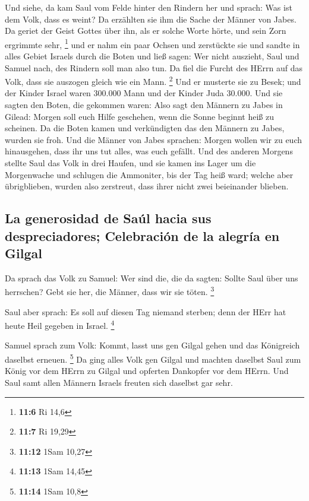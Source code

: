  Und siehe, da kam Saul vom Felde hinter den Rindern her
und sprach: Was ist dem Volk, dass es weint? Da erzählten sie ihm die
Sache der Männer von Jabes.  Da geriet der Geist Gottes
über ihn, als er solche Worte hörte, und sein Zorn ergrimmte sehr,
\footnote{\textbf{11:6} Ri 14,6}  und er nahm ein paar
Ochsen und zerstückte sie und sandte in alles Gebiet Israels durch die
Boten und ließ sagen: Wer nicht auszieht, Saul und Samuel nach, des
Rindern soll man also tun. Da fiel die Furcht des HErrn auf das Volk,
dass sie auszogen gleich wie ein Mann. \footnote{\textbf{11:7} Ri 19,29}
 Und er musterte sie zu Besek; und der Kinder Israel waren
300.000 Mann und der Kinder Juda 30.000.  Und sie sagten
den Boten, die gekommen waren: Also sagt den Männern zu Jabes in Gilead:
Morgen soll euch Hilfe geschehen, wenn die Sonne beginnt heiß zu
scheinen. Da die Boten kamen und verkündigten das den Männern zu Jabes,
wurden sie froh.  Und die Männer von Jabes sprachen:
Morgen wollen wir zu euch hinausgehen, dass ihr uns tut alles, was euch
gefällt.  Und des anderen Morgens stellte Saul das Volk
in drei Haufen, und sie kamen ins Lager um die Morgenwache und schlugen
die Ammoniter, bis der Tag heiß ward; welche aber übrigblieben, wurden
also zerstreut, dass ihrer nicht zwei beieinander blieben.

\hypertarget{la-generosidad-de-sauxfal-hacia-sus-despreciadores-celebraciuxf3n-de-la-alegruxeda-en-gilgal}{%
\subsection{La generosidad de Saúl hacia sus despreciadores; Celebración
de la alegría en
Gilgal}\label{la-generosidad-de-sauxfal-hacia-sus-despreciadores-celebraciuxf3n-de-la-alegruxeda-en-gilgal}}

 Da sprach das Volk zu Samuel: Wer sind die, die da
sagten: Sollte Saul über uns herrschen? Gebt sie her, die Männer, dass
wir sie töten. \footnote{\textbf{11:12} 1Sam 10,27}

 Saul aber sprach: Es soll auf diesen Tag niemand
sterben; denn der HErr hat heute Heil gegeben in Israel. \footnote{\textbf{11:13}
  1Sam 14,45}

 Samuel sprach zum Volk: Kommt, lasst uns gen Gilgal
gehen und das Königreich daselbst erneuen. \footnote{\textbf{11:14} 1Sam
  10,8}  Da ging alles Volk gen Gilgal und machten
daselbst Saul zum König vor dem HErrn zu Gilgal und opferten Dankopfer
vor dem HErrn. Und Saul samt allen Männern Israels freuten sich daselbst
gar sehr.

